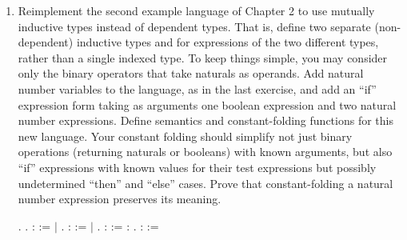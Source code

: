 \documentclass[12pt]{report}
\begin{document}
\begin{enumerate}
\begin{coqdoccode}
\coqdocnoindent
{} .\coqdoceol
\coqdocemptyline
\end{coqdoccode}
\item Reimplement the second example language of Chapter 2 to use mutually inductive types instead of dependent types.  That is, define two separate (non-dependent) inductive types  and  for expressions of the two different types, rather than a single indexed type.  To keep things simple, you may consider only the binary operators that take naturals as operands.  Add natural number variables to the language, as in the last exercise, and add an ``if'' expression form taking as arguments one boolean expression and two natural number expressions.  Define semantics and constant-folding functions for this new language.  Your constant folding should simplify not just binary operations (returning naturals or booleans) with known arguments, but also ``if'' expressions with known values for their test expressions but possibly undetermined ``then'' and ``else'' cases.  Prove that constant-folding a natural number expression preserves its meaning.
 \begin{coqdoccode}
\coqdocemptyline
\coqdocnoindent
{} .\coqdoceol
\coqdocindent{1.00em}
  .\coqdoceol
\coqdocindent{1.00em}
  :  :=  \ensuremath{|} .\coqdoceol
\coqdocindent{1.00em}
  :  :=  \ensuremath{|} .\coqdoceol
\coqdocemptyline
\coqdocindent{1.00em}
  :  :=  :   .\coqdoceol
\coqdocindent{1.00em}
  : :=\coqdoceol

\end{coqdoccode}
\end{enumerate}
\end{document}
